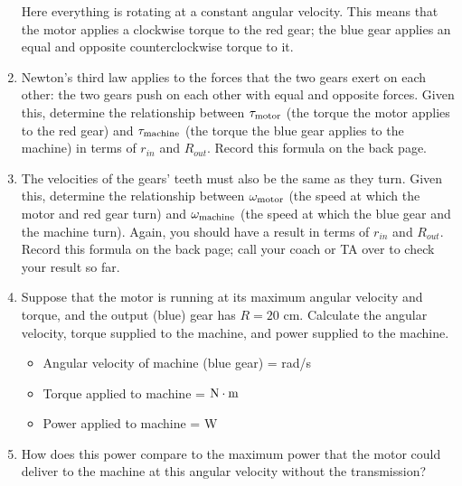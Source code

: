 \documentclass[12pt]{article}
\begin{document}
\begin{enumerate}
Here everything is rotating at a constant angular velocity. This means that the motor applies a clockwise torque to the red gear; the blue gear applies an equal and opposite counterclockwise torque to it.

\item Newton's third law applies to the forces that the two gears exert on each other: the two gears push on each other with equal and opposite forces. Given this, determine the relationship between $\tau_{\rm {motor}}$ (the torque the motor applies to the red gear) and $\tau_{\rm {machine}}$ (the torque the blue gear applies to the machine) in terms of $r_{in}$ and $R_{out}$. Record this formula on the back page.

\vspace{2in}

\item The velocities of the gears' teeth must also be the same as they turn. Given this, determine the relationship between $\omega_{\rm {motor}}$ (the speed at which the motor and red gear turn) and $\omega_{\rm {machine}}$ (the speed at which the blue gear and the machine turn). Again, you should have a result in terms of $r_{in}$ and $R_{out}$. Record this formula on the back page; call your coach or TA over to check your result so far.
\newpage

\vspace{2in}

\item  Suppose that the motor is running at its maximum angular velocity and torque, and the output (blue) gear has $R=20$ cm. Calculate the angular velocity, torque supplied to the machine, and power supplied to the machine. 

{\large
\begin{itemize}
	\item Angular velocity of machine (blue gear) = \underline{\hspace{2in}} rad/s
	\item Torque applied to machine = \underline{\hspace{2in}} $\rm N \cdot \rm m$
	\item Power applied to machine = \underline{\hspace{2in}} W
\end{itemize}
}

\item How does this power compare to the maximum power that the motor could deliver to the machine at this angular velocity without the transmission?



\end{enumerate}
\end{document}

